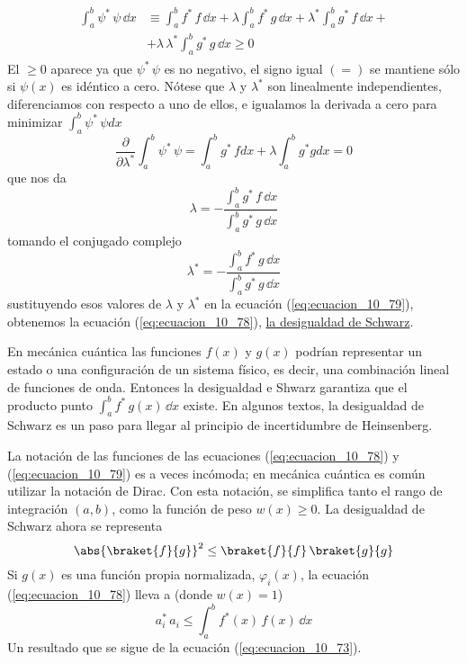 \begin{align}
\begin{aligned}
\int_{a}^{b} \psi^{*} \, \psi \, \dd x &\equiv \int_{a}^{b} f^{*} \, f \, \dd x + \lambda \int_{a}^{b} f^{*} \, g \, \dd x + \lambda^{*} \int_{a}^{b} g^{*} \, f \, \dd x + \\
&+ \lambda \, \lambda^{*} \int_{a}^{b} g^{*} \, g \, \dd x  \geq 0
\end{aligned}
\label{eq:ecuacion_10_79}
\end{align}
El $\geq 0$ aparece ya que $\psi^{*} \, \psi$ es no negativo, el signo igual $(=)$ se mantiene sólo si $\psi (x)$ es idéntico a cero. Nótese que $\lambda$ y $\lambda^{*}$ son linealmente independientes, diferenciamos con respecto a uno de ellos, e igualamos la derivada a cero para minimizar $\int_{a}^{b} \psi^{*} \, \psi dx$
\begin{equation*}
\dfrac{\partial}{\partial \lambda^{*}} \int_{a}^{b} \psi^{*} \, \psi = \int_{a}^{b} g^{*} \,f dx  + \lambda \int_{a}^{b} g^{*} g dx = 0
\end{equation*}
que nos da
\begin{equation}
\lambda = - \dfrac{\int_{a}^{b} g^{*} \, f \, \dd x}{\int_{a}^{b} g^{*} \, g \, \dd x}
\label{eq:ecuacion_10_80a}
\end{equation}
tomando el conjugado complejo 
\begin{equation}
\lambda^{*} = - \dfrac{\int_{a}^{b} f^{*} \, g \, \dd x}{\int_{a}^{b} g^{*} \, g \, \dd x}
\label{eq:ecuacion_80b}
\end{equation}
sustituyendo esos valores de $\lambda$ y $\lambda^{*}$ en la ecuación (\ref{eq:ecuacion_10_79}), obtenemos la ecuación (\ref{eq:ecuacion_10_78}), \underline{la desigualdad de Schwarz}.
\par
En mecánica cuántica las funciones $f(x)$ y $g(x)$ podrían representar un estado o una configuración de un sistema físico, es decir, una combinación lineal de funciones de onda. Entonces la desigualdad e Shwarz garantiza que el producto punto $\int_{a}^{b} f^{*} \, g(x) \, \dd x$ existe. En algunos textos, la desigualdad de Schwarz es un paso para llegar al principio de incertidumbre de Heinsenberg.
\par
La notación de las funciones de las ecuaciones (\ref{eq:ecuacion_10_78}) y (\ref{eq:ecuacion_10_79}) es a veces incómoda; en mecánica cuántica es común utilizar la notación de Dirac. Con esta notación, se simplifica tanto el rango de integración $(a, b)$, como la función de peso $w(x) \geq 0$. La desigualdad de Schwarz ahora se representa
\begin{equation}
\abs{\braket{f}{g}}^{2} \leq \braket{f}{f} \, \braket{g}{g}
\label{eq:ecuacion_10_78a}
\end{equation}
Si $g(x)$ es una función propia normalizada, $\varphi_{i}(x)$, la ecuación (\ref{eq:ecuacion_10_78}) lleva a (donde $w(x)=1$)
\begin{equation}
a_{i}^{*} \, a_{i} \leq \int_{a}^{b} f^{*}(x) \, f(x) \, \dd x 
\label{eq:ecuacion_10_81}
\end{equation}
Un resultado que se sigue de la ecuación (\ref{eq:ecuacion_10_73}).

